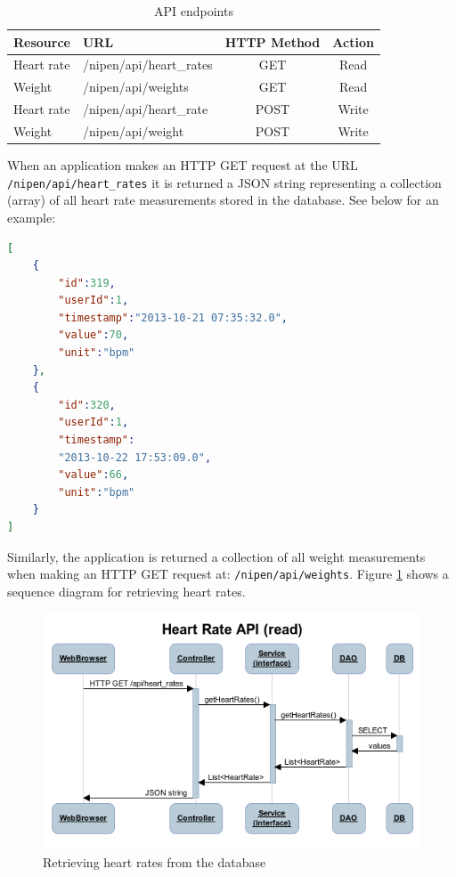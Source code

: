 \begin{table}[h]
\begin{center}
\begin{tabular}{ | l | l | c | c | }
	\hline
	Resource	& URL						& HTTP Method 	& Action \\
	\hline
	Heart rate	& /nipen/api/heart\_rates	& GET			& Read \\
	Weight		& /nipen/api/weights		& GET			& Read \\
	Heart rate	& /nipen/api/heart\_rate	& POST			& Write \\
	Weight		& /nipen/api/weight			& POST			& Write \\
	\hline
\end{tabular}
\end{center}
\caption{API endpoints}
\label{table:api}
\end{table}

When an application makes an HTTP GET request at the URL \verb|/nipen/api/heart_rates| it is returned a JSON
string representing a collection (array) of all heart rate measurements stored in the database.
See below for an example:
\begin{lstlisting}[language=json]
[
	{
		"id":319,
		"userId":1,
		"timestamp":"2013-10-21 07:35:32.0",
		"value":70,
		"unit":"bpm"
	},
	{
		"id":320,
		"userId":1,
		"timestamp":
		"2013-10-22 17:53:09.0",
		"value":66,
		"unit":"bpm"
	}
]
\end{lstlisting}
\label{listing:jsonarray}

Similarly, the application is returned a collection of all weight measurements when making an HTTP GET
request at: \verb|/nipen/api/weights|. Figure \ref{figure:seqhr} shows a sequence diagram for
retrieving heart rates.

\begin{figure}[h]
\centering
\includegraphics[scale=0.8]{../Figures/seqhr.png}
\caption{Retrieving heart rates from the database}
\label{figure:seqhr}
\end{figure}

